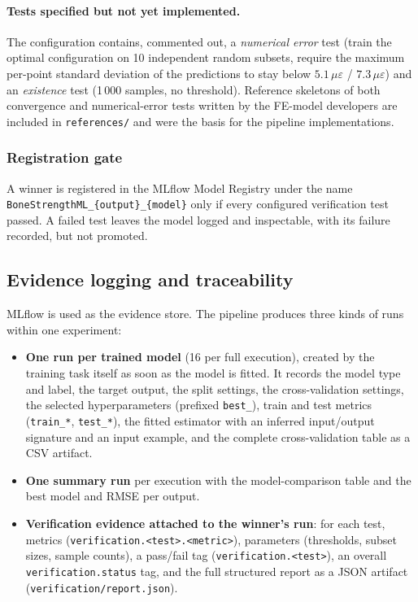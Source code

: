 \paragraph{Tests specified but not yet implemented.}
The configuration contains, commented out, a \emph{numerical error} test
(train the optimal configuration on 10 independent random subsets, require
the maximum per-point standard deviation of the predictions to stay below
$5.1\,\mu\varepsilon$ / $7.3\,\mu\varepsilon$) and an \emph{existence} test
(1\,000 samples, no threshold). Reference skeletons of both convergence and
numerical-error tests written by the FE-model developers are included in
\texttt{references/} and were the basis for the pipeline implementations.

\subsubsection{Registration gate}
\label{sec:methods:gate}

A winner is registered in the MLflow Model Registry under the name
\texttt{BoneStrengthML\_\{output\}\_\{model\}} only if every configured
verification test passed. A failed test leaves the model logged and
inspectable, with its failure recorded, but not promoted.

\subsection{Evidence logging and traceability}
\label{sec:methods:evidence}

MLflow is used as the evidence store. The pipeline produces three kinds of
runs within one experiment:

\begin{itemize}
  \item \textbf{One run per trained model} (16 per full execution), created by
    the training task itself as soon as the model is fitted. It records the
    model type and label, the target output, the split settings, the
    cross-validation settings, the selected hyperparameters (prefixed
    \texttt{best\_}), train and test metrics (\texttt{train\_*},
    \texttt{test\_*}), the fitted estimator with an inferred input/output
    signature and an input example, and the complete cross-validation table
    as a CSV artifact.
  \item \textbf{One summary run} per execution with the model-comparison
    table and the best model and RMSE per output.
  \item \textbf{Verification evidence attached to the winner's run}: for each
    test, metrics (\texttt{verification.<test>.<metric>}), parameters
    (thresholds, subset sizes, sample counts), a pass/fail tag
    (\texttt{verification.<test>}), an overall
    \texttt{verification.status} tag, and the full structured report as a
    JSON artifact (\texttt{verification/report.json}).
\end{itemize}


